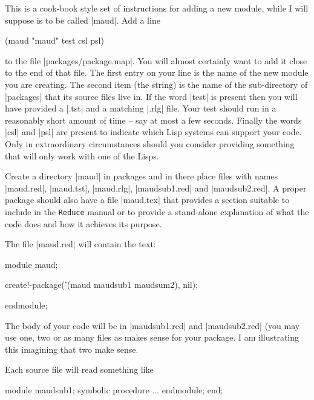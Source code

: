 \documentclass[12pt,twoside,openright]{memoir}
\newcommand{\reduce}{\texttt{Reduce}\xspace}
\begin{document}
This is a cook-book style set of instructions for adding a new module,
while I will suppose is to be called |maud|.
Add a line
\begin{rlispverb}
   (maud   "maud"   test csl psl)
\end{rlispverb}
to the file |packages/package.map|. You will almost certainly want to add it
close to the end of that file. The first entry on your line is the name of
the new module you are creating. The second item (the string) is the name
of the sub-directory of |packages| that its source files live in. If the
word |test| is present then you will have provided a |.tst| and a matching
|.rlg| file. Your test should run in a reasonably short amount of time -- say
at most a few seconds. Finally the words |csl| and |psl| are present to
indicate which Lisp systems can support your code. Only in extraordinary
circumstances should you consider providing something that will only work with
one of the Lisps.

Create a directory |maud| in packages and in there place files with names
|maud.red|, |maud.tst|, |maud.rlg|, |maudsub1.red| and |maudsub2.red|.
A proper package should also have a file |maud.tex| that provides a section
suitable to include in the \reduce manual or to provide a stand-alone
explanation of what the code does and how it achieves its purpose.

The file |maud.red| will contain the text:
\begin{rlispverb}
  module maud;

  create!-package('(maud maudsub1 maudsum2), nil);


  endmodule;
\end{rlispverb}

The body of your code will be in |maudsub1.red| and |maudsub2.red| (you may
use one, two or as many files as makes sense for your package. I am
illustrating this imagining that two make sense.

Each source file will read something like
\begin{rlispverb}
  module maudsub1;
  symbolic procedure ...
  endmodule;
  end;
\end{rlispverb}
\end{document}
